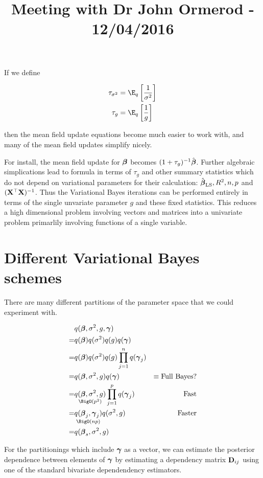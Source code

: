 \documentclass{amsart}
\title{Meeting with Dr John Ormerod - 12/04/2016}
\begin{document}
\maketitle

If we define

\begin{align*}
\tau_{\sigma^2} &= \E_q \left[\frac{1}{\sigma^2}\right] \\
\tau_g &= \E_q \left[\frac{1}{g}\right]
\end{align*}

then the mean field update equations become much easier to work with, and many of the mean field updates
simplify nicely.

For install, the mean field update for ${\boldsymbol \beta}$ becomes $(1 + \tau_g)^{-1} \hat{{\boldsymbol \beta}}$. Further algebraic
simplications lead to formula in terms of $\tau_g$ and other summary statistics which do not depend on
variational parameters for their calculation: $\hat{{\boldsymbol \beta}}_{\text{LS}}, R^2, n, p$ and $({\bf X}^\top {\bf X})^{-1}$.
Thus the Variational Bayes iterations can be performed entirely in terms of the single unvariate parameter $g$
and these fixed statistics. This reduces a high dimensional problem involving vectors and matrices into a
univariate problem primarlily involving functions of a single variable.

\section{Different Variational Bayes schemes}

There are many different partitions of the parameter space that we could experiment with.

\begin{align*}
&q(\vbeta, \sigma^2, g, \vgamma) \\
= &q(\vbeta) q(\sigma^2) q(g) q(\vgamma) \\
= &q(\vbeta) q(\sigma^2) q(g) \prod_{j=1}^n q(\vgamma_j) \\
= &q(\vbeta, \sigma^2, g) q(\vgamma) & \equiv \text{Full Bayes?} \\
= &\underset{\BigO(p^2)}{q(\vbeta, \sigma^2, g)} \prod_{j=1}^p q(\vgamma_j) & \text{ Fast} \\
= &\underset{\BigO(np)}{q(\vbeta_j, \vgamma_j)} q(\sigma^2, g) & \text{ Faster} \\
= &q(\vbeta_s, \sigma^2, g) \\
\end{align*}

For the partitionings which include ${\boldsymbol \gamma}$ as a vector, we can estimate the posterior dependence between
elements of ${\boldsymbol \gamma}$ by estimating a dependency matrix ${\bf D}_{ij}$ using one of the standard bivariate
dependendency estimators.
\end{document}
